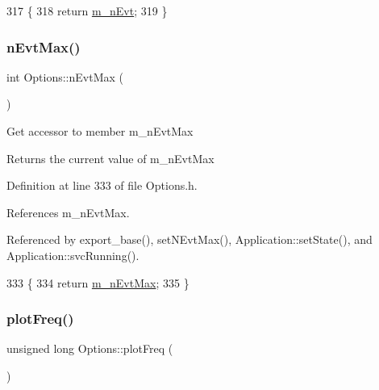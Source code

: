 \begin{DoxyCode}
317                               \{
318                 \textcolor{keywordflow}{return} \hyperlink{classOptions_a5e3bb1f2dfc4bf10cab08a33253cc4db}{m\_nEvt};
319         \}
\end{DoxyCode}
\mbox{\label{classOptions_ad1f3b03d734c806a2feca418b26bcc9b}} 
\subsubsection{\texorpdfstring{n\+Evt\+Max()}{nEvtMax()}}
{\footnotesize\ttfamily int Options\+::n\+Evt\+Max (\begin{DoxyParamCaption}{ }\end{DoxyParamCaption})\hspace{0.3cm}{\ttfamily [inline]}}

Get accessor to member m\+\_\+n\+Evt\+Max \begin{DoxyReturn}{Returns}
the current value of m\+\_\+n\+Evt\+Max 
\end{DoxyReturn}


Definition at line 333 of file Options.\+h.



References m\+\_\+n\+Evt\+Max.



Referenced by export\+\_\+base(), set\+N\+Evt\+Max(), Application\+::set\+State(), and Application\+::svc\+Running().


\begin{DoxyCode}
333                        \{
334                 \textcolor{keywordflow}{return} \hyperlink{classOptions_a825a47258257937a8caa902f5fff7e8a}{m\_nEvtMax};
335         \}
\end{DoxyCode}
\mbox{\label{classOptions_a1e20abb20c1a2187f9455b39cd9d26ae}} 
\subsubsection{\texorpdfstring{plot\+Freq()}{plotFreq()}}
{\footnotesize\ttfamily unsigned long Options\+::plot\+Freq (\begin{DoxyParamCaption}{ }\end{DoxyParamCaption})\hspace{0.3cm}{\ttfamily [inline]}}

